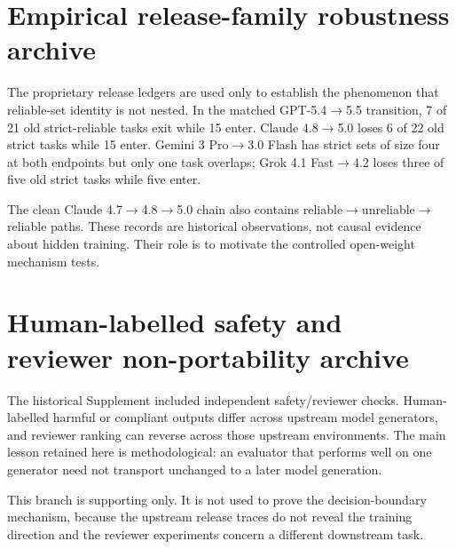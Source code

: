 \documentclass[11pt,letterpaper]{article}
\theoremstyle{plain}
\newcommand{\1}{\mathbf 1}
\begin{document}
\clearpage
\section{Empirical release-family robustness archive}
The proprietary release ledgers are used only to establish the phenomenon that reliable-set identity is not nested. In the matched GPT-5.4$\to$5.5 transition, 7 of 21 old strict-reliable tasks exit while 15 enter. Claude 4.8$\to$5.0 loses 6 of 22 old strict tasks while 15 enter. Gemini 3 Pro$\to$3.0 Flash has strict sets of size four at both endpoints but only one task overlaps; Grok 4.1 Fast$\to$4.2 loses three of five old strict tasks while five enter.

The clean Claude 4.7$\to$4.8$\to$5.0 chain also contains reliable$\to$unreliable$\to$reliable paths. These records are historical observations, not causal evidence about hidden training. Their role is to motivate the controlled open-weight mechanism tests.

\clearpage
\section{Human-labelled safety and reviewer non-portability archive}
The historical Supplement included independent safety/reviewer checks. Human-labelled harmful or compliant outputs differ across upstream model generators, and reviewer ranking can reverse across those upstream environments. The main lesson retained here is methodological: an evaluator that performs well on one generator need not transport unchanged to a later model generation.

This branch is supporting only. It is not used to prove the decision-boundary mechanism, because the upstream release traces do not reveal the training direction and the reviewer experiments concern a different downstream task.

\clearpage
\end{document}
